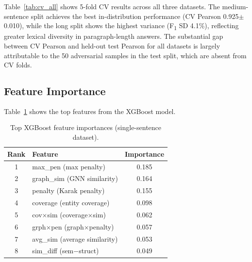 \documentclass[11pt]{article}
\begin{document}
\begin{table}[t]
  \centering
  \caption{5-fold CV across all three datasets.}
  \label{tab:cv_all}
\end{table}

Table~\ref{tab:cv_all} shows 5-fold CV results across all three datasets. The medium-sentence split achieves the best in-distribution performance (CV Pearson 0.925$\pm$0.010), while the long split shows the highest variance (F\textsubscript{1} SD 4.1\%), reflecting greater lexical diversity in paragraph-length answers. The substantial gap between CV Pearson and held-out test Pearson for all datasets is largely attributable to the 50 adversarial samples in the test split, which are absent from CV folds.


\subsection{Feature Importance}

Table~\ref{tab:feat_imp} shows the top features from the XGBoost model.

\begin{table}[t]
  \centering
  \small
  \begin{tabular}{clc}
    \toprule
    \textbf{Rank} & \textbf{Feature} & \textbf{Importance} \\
    \midrule
    1 & max\_pen (max penalty) & 0.185 \\
    2 & graph\_sim (GNN similarity) & 0.164 \\
    3 & penalty (Karak penalty) & 0.155 \\
    4 & coverage (entity coverage) & 0.098 \\
    5 & cov$\times$sim (coverage$\times$sim) & 0.062 \\
    6 & grph$\times$pen (graph$\times$penalty) & 0.057 \\
    7 & avg\_sim (average similarity) & 0.053 \\
    8 & sim\_diff (sem$-$struct) & 0.049 \\
    \bottomrule
  \end{tabular}
  \caption{Top XGBoost feature importances (single-sentence dataset).}
  \label{tab:feat_imp}
\end{table}
\end{document}
